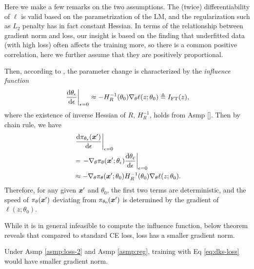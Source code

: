 Here we make a few remarks on the two assumptions. 
The (twice) differentiability of $\ell$ is valid based on the parametrization of the LM, and the regularization such as $L_2$ penalty has in fact constant Hessian. 
In terms of the relationship between gradient norm and loss, our insight is based on the finding that underfitted data (with high loss) often affects the training more, so there is a common positive correlation, here we further assume that they are positively proportional. 

Then, 
according to \citet{}, the parameter change is characterized by the \textit{influence function} 
% 
\begin{align*}
 \left. \frac{\mathop{}\!\mathrm{d} \theta_\epsilon}{\mathop{}\!\mathrm{d} \epsilon} \right|_{\epsilon = 0} 
 \approx - H^{-1}_R(\theta_0) \nabla_\theta \ell(z; \theta_0) \triangleq I_\text{FT}(z), 
\end{align*}
% 
where the existence of inverse Hessian of $R$, $H^{-1}_R$, holds from Asmp \ref{}. 
Then by chain rule, we have 
% 
\begin{align*}
& \left. \frac{\mathop{}\!\mathrm{d} \pi_{\theta_\epsilon} (\boldsymbol{x}')}{ \mathop{}\!\mathrm{d} \epsilon} \right|_{\epsilon = 0} \\
&= 
\left. - \nabla_\theta \pi_{\theta}(\boldsymbol{x}'; \theta_{\epsilon}) \frac{\mathop{}\!\mathrm{d} \theta_\epsilon}{\mathop{}\!\mathrm{d} \epsilon} \right|_{\epsilon = 0} \\
&\approx  
- \nabla_\theta \pi_{\theta}(\boldsymbol{x}'; \theta_0) H^{-1}_R(\theta_0) \nabla_\theta \ell(z; \theta_0).
\end{align*}
% 
Therefore,
for any given $\boldsymbol{x}'$ and $\theta_0$, the first two terms are deterministic, and 
the speed of $\pi_\theta(\boldsymbol{x}')$ deviating from $\pi_{\theta_0}(\boldsymbol{x}')$ is determined by the gradient of $\ell(z; \theta_0)$. 

While it is in general infeasible to compute the influence function, 
below theorem reveals that compared to standard CE loss, {\NAME} loss has a smaller gradient norm.


\begin{theorem}
Under Asmp \ref{asmp:loss-2} and Asmp \ref{asmp:reg}, 
training with Eq \eqref{eq:dks-loss} would have smaller gradient norm. 
\end{theorem}



